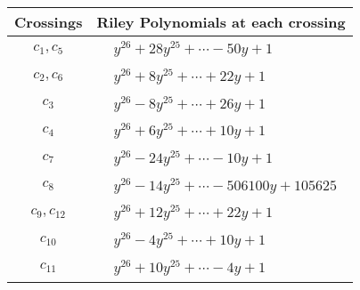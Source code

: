 \documentclass[1p]{elsarticle_modified}
\theoremstyle{definition}
\begin{document}
\begin{tabular}{m{50pt}|m{274pt}}
Crossings & \hspace{64pt}Riley Polynomials at each crossing \\
\hline $$\begin{aligned}c_{1},c_{5}\end{aligned}$$&$\begin{aligned}
&y^{26}+28 y^{25}+\cdots-50 y+1
\end{aligned}$\\
\hline $$\begin{aligned}c_{2},c_{6}\end{aligned}$$&$\begin{aligned}
&y^{26}+8 y^{25}+\cdots+22 y+1
\end{aligned}$\\
\hline $$\begin{aligned}c_{3}\end{aligned}$$&$\begin{aligned}
&y^{26}-8 y^{25}+\cdots+26 y+1
\end{aligned}$\\
\hline $$\begin{aligned}c_{4}\end{aligned}$$&$\begin{aligned}
&y^{26}+6 y^{25}+\cdots+10 y+1
\end{aligned}$\\
\hline $$\begin{aligned}c_{7}\end{aligned}$$&$\begin{aligned}
&y^{26}-24 y^{25}+\cdots-10 y+1
\end{aligned}$\\
\hline $$\begin{aligned}c_{8}\end{aligned}$$&$\begin{aligned}
&y^{26}-14 y^{25}+\cdots-506100 y+105625
\end{aligned}$\\
\hline $$\begin{aligned}c_{9},c_{12}\end{aligned}$$&$\begin{aligned}
&y^{26}+12 y^{25}+\cdots+22 y+1
\end{aligned}$\\
\hline $$\begin{aligned}c_{10}\end{aligned}$$&$\begin{aligned}
&y^{26}-4 y^{25}+\cdots+10 y+1
\end{aligned}$\\
\hline $$\begin{aligned}c_{11}\end{aligned}$$&$\begin{aligned}
&y^{26}+10 y^{25}+\cdots-4 y+1
\end{aligned}$\\
\hline
\end{tabular}\\~\\
\end{document}
